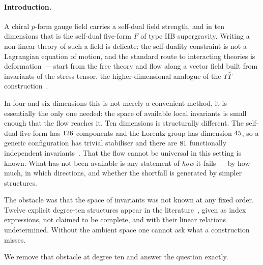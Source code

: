 \documentclass[aps,prl,reprint,superscriptaddress,nofootinbib,floatfix]{revtex4-2}
\begin{document}
\begin{center}\end{center}

\paragraph*{Introduction.}
A chiral $p$-form gauge field carries a self-dual field strength, and in ten
dimensions that is the self-dual five-form $F$ of type IIB supergravity. Writing
a non-linear theory of such a field is delicate: the self-duality constraint is
not a Lagrangian equation of motion, and the standard route to interacting
theories is deformation --- start from the free theory and flow along a vector
field built from invariants of the stress tensor, the higher-dimensional analogue
of the $T\bar T$ construction~\cite{Hutomo:2025chiral}.

In four and six dimensions this is not merely a convenient method, it is
essentially the only one needed: the space of available local invariants is small
enough that the flow reaches it. Ten dimensions is structurally different. The
self-dual five-form has $126$ components and the Lorentz group has
dimension $45$, so a generic configuration has trivial stabiliser
and there are $81$ functionally independent
invariants~\cite{Hutomo:2025chiral}. That the flow cannot be universal in this
setting is known. What has not been available is any statement of \emph{how} it
fails --- by how much, in which directions, and whether the shortfall is
generated by simpler structures.

The obstacle was that the space of invariants was not known at any fixed order.
Twelve explicit degree-ten structures appear in the
literature~\cite{Cederwall:2025invariants}, given as index expressions, not
claimed to be complete, and with their linear relations undetermined. Without the
ambient space one cannot ask what a construction misses.

We remove that obstacle at degree ten and answer the question exactly.
\end{document}
